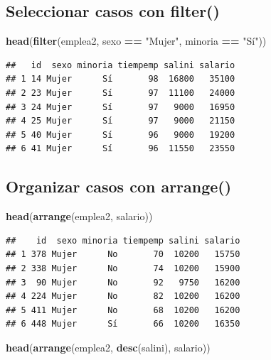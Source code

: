 \documentclass[]{book}
\newenvironment{Shaded}{\begin{snugshade}}{\end{snugshade}}
\newcommand{\KeywordTok}[1]{\textcolor[rgb]{0.13,0.29,0.53}{\textbf{#1}}}
\newcommand{\NormalTok}[1]{#1}
\newcommand{\OperatorTok}[1]{\textcolor[rgb]{0.81,0.36,0.00}{\textbf{#1}}}
\newcommand{\StringTok}[1]{\textcolor[rgb]{0.31,0.60,0.02}{#1}}
\begin{document}
\hypertarget{seleccionar-casos-con-filter}{%
\subsection{\texorpdfstring{Seleccionar casos con \textbf{filter()}}{Seleccionar casos con filter()}}\label{seleccionar-casos-con-filter}}

\begin{Shaded}
\begin{Highlighting}[]
\KeywordTok{head}\NormalTok{(}\KeywordTok{filter}\NormalTok{(emplea2, sexo }\OperatorTok{==}\StringTok{ "Mujer"}\NormalTok{, minoria }\OperatorTok{==}\StringTok{ "Sí"}\NormalTok{))}
\end{Highlighting}
\end{Shaded}

\begin{verbatim}
##   id  sexo minoria tiempemp salini salario
## 1 14 Mujer      Sí       98  16800   35100
## 2 23 Mujer      Sí       97  11100   24000
## 3 24 Mujer      Sí       97   9000   16950
## 4 25 Mujer      Sí       97   9000   21150
## 5 40 Mujer      Sí       96   9000   19200
## 6 41 Mujer      Sí       96  11550   23550
\end{verbatim}

\hypertarget{organizar-casos-con-arrange}{%
\subsection{\texorpdfstring{Organizar casos con \textbf{arrange()}}{Organizar casos con arrange()}}\label{organizar-casos-con-arrange}}

\begin{Shaded}
\begin{Highlighting}[]
\KeywordTok{head}\NormalTok{(}\KeywordTok{arrange}\NormalTok{(emplea2, salario))}
\end{Highlighting}
\end{Shaded}

\begin{verbatim}
##    id  sexo minoria tiempemp salini salario
## 1 378 Mujer      No       70  10200   15750
## 2 338 Mujer      No       74  10200   15900
## 3  90 Mujer      No       92   9750   16200
## 4 224 Mujer      No       82  10200   16200
## 5 411 Mujer      No       68  10200   16200
## 6 448 Mujer      Sí       66  10200   16350
\end{verbatim}

\begin{Shaded}
\begin{Highlighting}[]
\KeywordTok{head}\NormalTok{(}\KeywordTok{arrange}\NormalTok{(emplea2, }\KeywordTok{desc}\NormalTok{(salini), salario))}
\end{Highlighting}
\end{Shaded}
\end{document}
